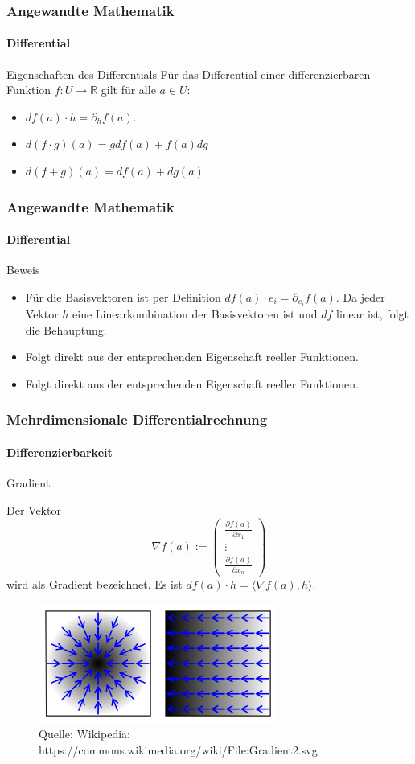 \documentclass{beamer}
\begin{document}
\begin{frame}
    \frametitle{Angewandte Mathematik}
\framesubtitle{Differential}
    \begin{block}{Eigenschaften des Differentials}
Für das Differential einer differenzierbaren Funktion  $f: U \to \mathbb{R}$ gilt für alle $a \in U$:
\begin{itemize}
\item $df(a)  \cdot h = \partial_h f(a)$. 
\item $d (f \cdot g)(a) = g df(a) + f(a) dg$
\item $d(f + g)(a) = df(a) + dg(a)$
\end{itemize}
\end{block}
 \end{frame}

\begin{frame}
    \frametitle{Angewandte Mathematik}
\framesubtitle{Differential}
    \begin{block}{Beweis}
\begin{itemize}
\item Für die Basisvektoren ist per Definition $df(a)  \cdot e_i = \partial_{e_i} f(a)$. Da jeder Vektor $h$ eine Linearkombination der Basisvektoren ist und $df$ linear ist, folgt die Behauptung.
\item Folgt direkt aus der entsprechenden Eigenschaft reeller Funktionen.
\item Folgt direkt aus der entsprechenden Eigenschaft reeller Funktionen.
\end{itemize}
\end{block}
 \end{frame}




\begin{frame}
    \frametitle{Mehrdimensionale Differentialrechnung}
\framesubtitle{Differenzierbarkeit}
    \begin{block}{Gradient}

Der Vektor 
$$\nabla f (a) := \begin{pmatrix}  \frac{\partial f(a)}{\partial x_1} \\  \vdots \\ \frac{\partial f(a)}{\partial x_n}  \end{pmatrix}$$
wird als Gradient bezeichnet. Es ist $df(a) \cdot h = \langle \nabla f (a) , h \rangle$.
\end{block}
\begin{figure}[H]
      \centering
    \includegraphics[width=0.7\textwidth]{images/Gradient}
      \caption{Quelle: Wikipedia: https://commons.wikimedia.org/wiki/File:Gradient2.svg}
\end{figure}


 \end{frame}
\end{document}
